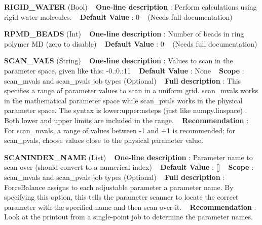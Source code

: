 \begin{DoxyItemize}
\item {\bfseries  R\+I\+G\+I\+D\+\_\+\+W\+A\+T\+ER } (Bool) ~\newline
{\bfseries  One-\/line description }\+: Perform calculations using rigid water molecules. ~\newline
{\bfseries  Default Value }\+: 0 ~\newline
(Needs full documentation)\end{DoxyItemize}
\begin{DoxyItemize}
\item {\bfseries  R\+P\+M\+D\+\_\+\+B\+E\+A\+DS } (Int) ~\newline
{\bfseries  One-\/line description }\+: Number of beads in ring polymer MD (zero to disable) ~\newline
{\bfseries  Default Value }\+: 0 ~\newline
(Needs full documentation)\end{DoxyItemize}
\begin{DoxyItemize}
\item {\bfseries  S\+C\+A\+N\+\_\+\+V\+A\+LS } (String) ~\newline
{\bfseries  One-\/line description }\+: Values to scan in the parameter space, given like this\+: -\/0.\+:0.\+:11 ~\newline
{\bfseries  Default Value }\+: None ~\newline
{\bfseries  Scope }\+: scan\+\_\+mvals and scan\+\_\+pvals job types (Optional) ~\newline
{\bfseries  Full description }\+: This specifies a range of parameter values to scan in a uniform grid. scan\+\_\+mvals works in the mathematical parameter space while scan\+\_\+pvals works in the physical parameter space. The syntax is lower\+:upper\+:nsteps (just like numpy.\+linspace) . Both lower and upper limits are included in the range. ~\newline
{\bfseries  Recommendation }\+: For scan\+\_\+mvals, a range of values between -\/1 and +1 is recommended; for scan\+\_\+pvals, choose values close to the physical parameter value.\end{DoxyItemize}
\begin{DoxyItemize}
\item {\bfseries  S\+C\+A\+N\+I\+N\+D\+E\+X\+\_\+\+N\+A\+ME } (List) ~\newline
{\bfseries  One-\/line description }\+: Parameter name to scan over (should convert to a numerical index) ~\newline
{\bfseries  Default Value }\+: \mbox{[}\mbox{]} ~\newline
{\bfseries  Scope }\+: scan\+\_\+mvals and scan\+\_\+pvals job types (Optional) ~\newline
{\bfseries  Full description }\+: Force\+Balance assigns to each adjustable parameter a \textquotesingle{}parameter name\textquotesingle{}. By specifying this option, this tells the parameter scanner to locate the correct parameter with the specified name and then scan over it. ~\newline
{\bfseries  Recommendation }\+: Look at the printout from a single-\/point job to determine the parameter names.\end{DoxyItemize}
